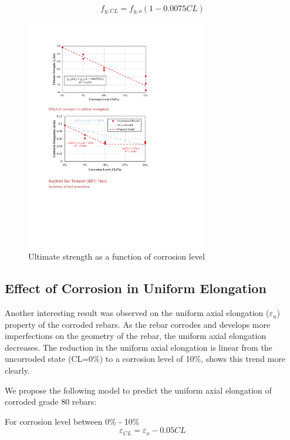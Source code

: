 \begin{equation}
    f_{y,CL} = f_{y,o}(1-0.0075CL)
    \label{eq.Calderon_Fu_vs_CL}
\end{equation}

\begin{figure}[htbp]
	\centering
	\includegraphics[width=0.7\textwidth]{VAC Thesis 2.0/Chapter-4/figs/TensionTest_results_5_UltimateStrength.pdf}
	\caption{Ultimate strength as a function of corrosion level}
	\label{fig:Calderon_ultimate_strength}
\end{figure}

\subsection{Effect of Corrosion in Uniform Elongation}

Another interesting result was observed on the uniform axial elongation ($\varepsilon_{u}$) property of the corroded rebars. As the rebar corrodes and develops more imperfections on the geometry of the rebar, the uniform axial elongation decreases. The reduction in the uniform axial elongation is linear from the uncorroded state  (CL=0\%) to a corrosion level of 10\%,  shows this trend more clearly. 

We propose the following model to predict the uniform axial elongation of corroded grade 80 rebars:

For corrosion level between 0\% - 10\%
\begin{equation}
    \varepsilon_{CL} = \varepsilon_{o}-0.05CL
    \label{eq.Calderon_UAE_vs_CL}
\end{equation}

